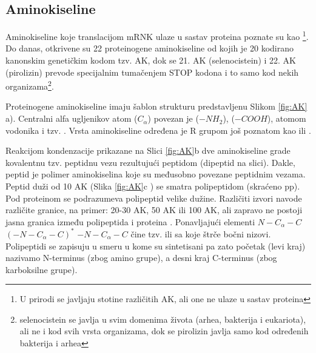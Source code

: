 \subsection{Aminokiseline}
Aminokiseline koje translacijom mRNK ulaze u sastav proteina poznate su kao
\footnote{U prirodi se javljaju stotine različitih AK, ali
one ne ulaze u sastav proteina}.  Do danas, otkrivene su 22 proteinogene
aminokiseline od kojih je 20 kodirano kanonskim genetičkim kodom tzv.
 AK, dok se 21. AK (selenocistein) i 22. AK (pirolizin)
prevode specijalnim tumačenjem STOP kodona i to samo kod nekih organizama\footnote{
  selenocistein se javlja u svim domenima života (arhea, bakterija i
  eukariota), ali ne i kod svih vrsta organizama, dok se pirolizin javlja samo
kod određenih bakterija i arhea}. 

Proteinogene aminokiseline imaju šablon strukturu predstavljenu Slikom \ref{fig:AK} a).
Centralni alfa ugljenikov atom ($C_{\alpha}$) povezan je  ($-NH_2$), 
 ($-COOH$), atomom vodonika i tzv. .
Vrsta aminokiseline određena je R grupom još poznatom kao  ili  .

Reakcijom kondenzacije prikazane na Slici \ref{fig:AK}b dve aminokiseline grade
kovalentnu tzv. peptidnu vezu rezultujući peptidom (dipeptid na slici).  Dakle,
peptid je polimer aminokiselina koje su međusobno povezane peptidnim vezama.
Peptid duži od 10 AK (Slika \ref{fig:AK}c ) se smatra polipeptidom (skraćeno
pp). Pod proteinom se podrazumeva polipeptid velike dužine. Različiti izvori
navode različite granice, na primer: 20-30 AK, 50 AK ili 100 AK, ali zapravo ne
postoji jasna granica između polipeptida i proteina
\parencite{protein_slajdovi}. Ponavljajući elementi $N-C_\alpha-C$
$(-N-C_\alpha-C)^*$ $-N-C_\alpha-C$ čine tzv.   ili
 sa koje štrče bočni nizovi.  Polipeptidi se zapisuju u
smeru u kome su sintetisani pa zato  početak (levi kraj) nazivamo N-terminus
(zbog amino grupe), a desni kraj C-terminus (zbog
karboksilne grupe).


